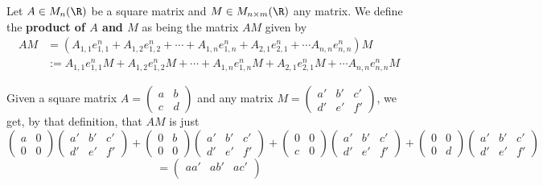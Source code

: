 \begin{df}
	Let $A\in M_n(\R)$ be a square matrix and $M\in M_{n\times m}(\R)$ any matrix. We define the \textbf{product of $A$ and $M$} as being the matrix $AM$ given by
	\begin{align*}
	AM&=(A_{1,1}e^n_{1,1}+A_{1,2}e^n_{1,2}+\cdots+A_{1,n}e^n_{1,n}+A_{2,1}e^n_{2,1}+\cdots A_{n,n}e^n_{n,n})M\\&:=A_{1,1}e^n_{1,1}M+A_{1,2}e^n_{1,2}M+\cdots+A_{1,n}e^n_{1,n}M+A_{2,1}e^n_{2,1}M+\cdots A_{n,n}e^n_{n,n}M
	\end{align*}
\end{df}

\begin{ex}
	Given a square matrix $A=\begin{pmatrix}
	a & b\\
	c & d
	\end{pmatrix}$ and any matrix $M=\begin{pmatrix}
a' &b' & c'\\
d' & e' & f'
\end{pmatrix}$, we get, by that definition, that $AM$ is just
\[\begin{pmatrix}
a & 0\\
0 & 0
\end{pmatrix}\begin{pmatrix}
a' &b' & c'\\
d' & e' & f'
\end{pmatrix}+\begin{pmatrix}
0 & b\\
0 & 0
\end{pmatrix}\begin{pmatrix}
a' &b' & c'\\
d' & e' & f'
\end{pmatrix}+\begin{pmatrix}
0 & 0\\
c & 0
\end{pmatrix}\begin{pmatrix}
a' &b' & c'\\
d' & e' & f'
\end{pmatrix}+\begin{pmatrix}
0 & 0\\
0 & d
\end{pmatrix}\begin{pmatrix}
a' &b' & c'\\
d' & e' & f'
\end{pmatrix}\]
\[=\begin{pmatrix}
aa' &ab' & ac'\\

\end{pmatrix}\]
\end{ex}

